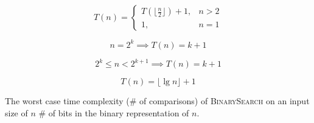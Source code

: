 \begin{frame}{}
  \[
    T(n) = \left\{\begin{array}{lr}
      T(\lfloor \frac{n}{2} \rfloor) + 1, & n > 2 \\
      1, & n = 1
    \end{array}\right.
  \]

  \pause
  \vspace{0.30cm}
  \[
    n = 2^k \implies T(n) = k + 1
  \]

  \pause
  \vspace{0.30cm}
  \[
    2^k \le n < 2^{k+1} \implies T(n) = k + 1
  \]

  \pause
  \vspace{0.30cm}
  \[
    T(n) = \lfloor \lg n \rfloor + 1
  \]

  \begin{theorem}
    The worst case time complexity (\# of comparisons) of \textsc{BinarySearch} on an input size of $n$ \teal{$=$} \# of bits in the binary representation of $n$.
  \end{theorem}
\end{frame}

\begin{frame}{}
\end{frame}

\begin{frame}{}
\end{frame}

\begin{frame}{}
\end{frame}
